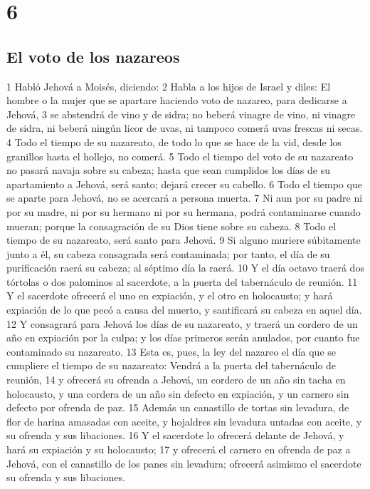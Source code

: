 \chapter{6}

\section*{El voto de los nazareos}


1 Habló Jehová a Moisés, diciendo:
2 Habla a los hijos de Israel y diles: El hombre o la mujer que se apartare haciendo voto de nazareo, para dedicarse a Jehová,
3 se abstendrá de vino y de sidra; no beberá vinagre de vino, ni vinagre de sidra, ni beberá ningún licor de uvas, ni tampoco comerá uvas frescas ni secas.
4 Todo el tiempo de su nazareato, de todo lo que se hace de la vid, desde los granillos hasta el hollejo, no comerá.
5 Todo el tiempo del voto de su nazareato no pasará navaja sobre su cabeza; hasta que sean cumplidos los días de su apartamiento a Jehová, será santo; dejará crecer su cabello.
6 Todo el tiempo que se aparte para Jehová, no se acercará a persona muerta.
7 Ni aun por su padre ni por su madre, ni por su hermano ni por su hermana, podrá contaminarse cuando mueran; porque la consagración de su Dios tiene sobre su cabeza.
8 Todo el tiempo de su nazareato, será santo para Jehová.
9 Si alguno muriere súbitamente junto a él, su cabeza consagrada será contaminada; por tanto, el día de su purificación raerá su cabeza; al séptimo día la raerá.
10 Y el día octavo traerá dos tórtolas o dos palominos al sacerdote, a la puerta del tabernáculo de reunión.
11 Y el sacerdote ofrecerá el uno en expiación, y el otro en holocausto; y hará expiación de lo que pecó a causa del muerto, y santificará su cabeza en aquel día.
12 Y consagrará para Jehová los días de su nazareato, y traerá un cordero de un año en expiación por la culpa; y los días primeros serán anulados, por cuanto fue contaminado su nazareato.
13 Esta es, pues, la ley del nazareo el día que se cumpliere el tiempo de su nazareato: Vendrá a la puerta del tabernáculo de reunión,
14 y ofrecerá su ofrenda a Jehová, un cordero de un año sin tacha en holocausto, y una cordera de un año sin defecto en expiación, y un carnero sin defecto por ofrenda de paz.
15 Además un canastillo de tortas sin levadura, de flor de harina amasadas con aceite, y hojaldres sin levadura untadas con aceite, y su ofrenda y sus libaciones.
16 Y el sacerdote lo ofrecerá delante de Jehová, y hará su expiación y su holocausto;
17 y ofrecerá el carnero en ofrenda de paz a Jehová, con el canastillo de los panes sin levadura; ofrecerá asimismo el sacerdote su ofrenda y sus libaciones.
